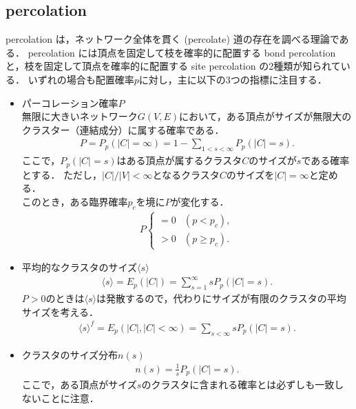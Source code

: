 \documentclass[../main]{subfiles}
\begin{document}
\subsection{percolation}
percolation は，ネットワーク全体を貫く (percolate) 道の存在を調べる理論である．
percolation には頂点を固定して枝を確率的に配置する bond percolation と，枝を固定して頂点を確率的に配置する site percolation の2種類が知られている．
いずれの場合も配置確率$p$に対し，主に以下の3つの指標に注目する．
\begin{itemize}
    \item パーコレーション確率$P$\\
        無限に大きいネットワーク$G(V,E)$において，ある頂点がサイズが無限大のクラスター（連結成分）に属する確率である．
        \begin{align*}
            P=P_p(|C|=\infty)=1-\sum_{1<s<\infty}P_p(|C|=s).
        \end{align*} 
        ここで，$P_p(|C|=s)$はある頂点が属するクラスタ$C$のサイズが$s$である確率とする．
        ただし，$|C|/|V|<\infty$となるクラスタ$C$のサイズを$|C|=\infty$と定める．\\
        このとき，ある臨界確率$p_c$を境に$P$が変化する．
        \begin{align*}
            P
            \begin{cases}
                = 0 & (p<p_c),\\
                > 0 & (p\geq p_c).
            \end{cases}
        \end{align*}
    \item 平均的なクラスタのサイズ$\langle s \rangle$
        \begin{align*}
            \langle s\rangle =E_p(|C|)=\sum_{s=1}^\infty sP_p(|C|=s).
        \end{align*}
        $P>0$のときは$\langle s\rangle$は発散するので，代わりにサイズが有限のクラスタの平均サイズを考える．
        \begin{align*}
            \langle s\rangle^f =E_p(|C|,|C|<\infty)=\sum_{s<\infty} sP_p(|C|=s).            
        \end{align*}
    \item クラスタのサイズ分布$n(s)$
    \begin{align*}
        n(s)=\frac{1}{s}P_p(|C|=s).
    \end{align*}
    ここで，ある頂点がサイズ$s$のクラスタに含まれる確率とは必ずしも一致しないことに注意．
\end{itemize}
\end{document}
